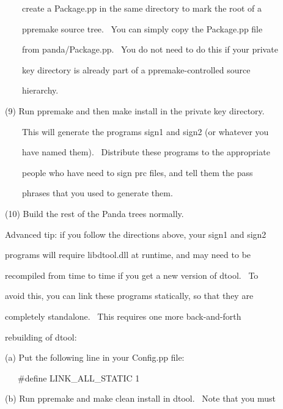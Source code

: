 \documentclass[a4paper]{article}
\begin{document}
{\color{black}
\ \ \ \ create a Package.pp in the same directory to mark the root of a}

{\color{black}
\ \ \ \ ppremake source tree. \ You can simply copy the Package.pp file}

{\color{black}
\ \ \ \ from panda/Package.pp. \ You do not need to do this if your private}

{\color{black}
\ \ \ \ key directory is already part of a ppremake-controlled source}

{\color{black}
\ \ \ \ hierarchy.}

\clearpage
\bigskip


\bigskip

{\color{black}
(9) Run ppremake and then make install in the private key directory.}

{\color{black}
\ \ \ \ This will generate the programs sign1 and sign2 (or whatever you}

{\color{black}
\ \ \ \ have named them). \ Distribute these programs to the appropriate}

{\color{black}
\ \ \ \ people who have need to sign prc files, and tell them the pass}

{\color{black}
\ \ \ \ phrases that you used to generate them.}


\bigskip

{\color{black}
(10) Build the rest of the Panda trees normally.}


\bigskip

{\color{black}
Advanced tip: if you follow the directions above, your sign1 and sign2}

{\color{black}
programs will require libdtool.dll at runtime, and may need to be}

{\color{black}
recompiled from time to time if you get a new version of dtool. \ To}

{\color{black}
avoid this, you can link these programs statically, so that they are}

{\color{black}
completely standalone. \ This requires one more back-and-forth}

{\color{black}
rebuilding of dtool:}

{\color{black}
(a) Put the following line in your Config.pp file:}


\bigskip

{\color{black}
\ \ \ \#define LINK\_ALL\_STATIC 1}


\bigskip

{\color{black}
(b) Run ppremake and make clean install in dtool. \ Note that you must}
\end{document}
